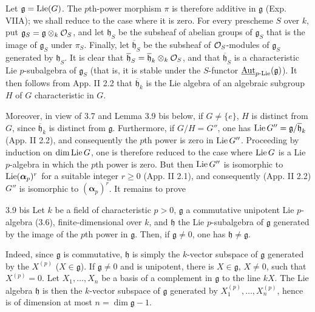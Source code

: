 Let $\mathfrak g=\operatorname{Lie}(G)$. The $p$th-power morphism $\pi$ is therefore additive in $\mathfrak g$ (Exp. VIIA); we shall reduce to the case where it is zero. For every prescheme $S$ over $k$, put $\mathfrak g_S=\mathfrak g\otimes_k\mathcal{O}_S$, and let $\mathfrak h_S$ be the subsheaf of abelian groups of $\mathfrak g_S$ that is the image of $\mathfrak g_S$ under $\pi_S$. Finally, let $\overline{\mathfrak h}_S$ be the subsheaf of $\mathcal{O}_S$-modules of $\mathfrak g_S$ generated by $\mathfrak h_S$. It is clear that $\overline{\mathfrak h}_S=\overline{\mathfrak h}_k\otimes_k\mathcal{O}_S$, and that $\overline{\mathfrak h}_S$ is a characteristic Lie $p$-subalgebra of $\mathfrak g_S$ (that is, it is stable under the $S$-functor $\underline{\operatorname{Aut}}_{p\text{-Lie}}(\mathfrak g)$). It then follows from App. II 2.2 that $\overline{\mathfrak h}_k$ is the Lie algebra of an algebraic subgroup $H$ of $G$ characteristic in $G$.

Moreover, in view of 3.7 and Lemma 3.9 bis below, if $G\neq\{e\}$, $H$ is distinct from $G$, since $\overline{\mathfrak h}_k$ is distinct from $\mathfrak g$. Furthermore, if $G/H=G''$, one has $\operatorname{Lie} G''=\mathfrak g/\overline{\mathfrak h}_k$ (App. II 2.2), and consequently the $p$th power is zero in $\operatorname{Lie} G''$. Proceeding by induction on $\dim\operatorname{Lie} G$, one is therefore reduced to the case where $\operatorname{Lie} G$ is a Lie $p$-algebra in which the $p$th power is zero. But then $\operatorname{Lie} G''$ is isomorphic to $\operatorname{Lie}(\boldsymbol\alpha_p)^r$ for a suitable integer $r\geq0$ (App. II 2.1), and consequently (App. II 2.2) $G''$ is isomorphic to $(\boldsymbol\alpha_p)^r$. It remains to prove
\begin{lemma}{3.9 bis}\label{XVII.3.9bis}
Let $k$ be a field of characteristic $p>0$, $\mathfrak g$ a commutative unipotent Lie $p$-algebra (3.6), finite-dimensional over $k$, and $\mathfrak h$ the Lie $p$-subalgebra of $\mathfrak g$ generated by the image of the $p$th power in $\mathfrak g$. Then, if $\mathfrak g\neq0$, one has $\mathfrak h\neq\mathfrak g$.
\end{lemma}
Indeed, since $\mathfrak g$ is commutative, $\mathfrak h$ is simply the $k$-vector subspace of $\mathfrak g$ generated by the $X^{(p)}$ ($X\in\mathfrak g$). If $\mathfrak g\neq0$ and is unipotent, there is $X\in\mathfrak g$, $X\neq0$, such that $X^{(p)}=0$. Let $X_1,\ldots,X_n$ be a basis of a complement in $\mathfrak g$ to the line $kX$. The Lie algebra $\mathfrak h$ is then the $k$-vector subspace of $\mathfrak g$ generated by $X_1^{(p)},\ldots,X_n^{(p)}$, hence is of dimension at most $n=\dim\mathfrak g-1$.


